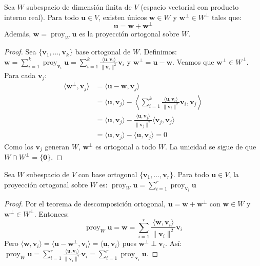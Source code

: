 \begin{theorem}
Sea $W$ subespacio de dimensión finita de $V$ (espacio vectorial con producto interno real). Para todo $\mathbf{u} \in V$, existen únicos $\mathbf{w} \in W$ y $\mathbf{w}^\perp \in W^\perp$ tales que:
\[
\mathbf{u} = \mathbf{w} + \mathbf{w}^\perp
\]
Además, $\mathbf{w} = \operatorname{proy}_W \mathbf{u}$ es la proyección ortogonal sobre $W$.
\end{theorem}

\begin{proof}
Sea $\{ \mathbf{v}_1, \dots, \mathbf{v}_k \}$ base ortogonal de $W$. Definimos: \(
\mathbf{w} = \sum_{i=1}^k \operatorname{proy}_{\mathbf{v}_i} \mathbf{u} = \sum_{i=1}^k \frac{\langle \mathbf{u}, \mathbf{v}_i \rangle}{\|\mathbf{v}_i\|^2} \mathbf{v}_i
\) 
y $\mathbf{w}^\perp = \mathbf{u} - \mathbf{w}$. Veamos que $\mathbf{w}^\perp \in W^\perp$. Para cada $\mathbf{v}_j$:
\begin{align*}
\langle \mathbf{w}^\perp, \mathbf{v}_j \rangle &= \langle \mathbf{u} - \mathbf{w}, \mathbf{v}_j \rangle \\
&= \langle \mathbf{u}, \mathbf{v}_j \rangle - \left\langle \sum_{i=1}^k \frac{\langle \mathbf{u}, \mathbf{v}_i \rangle}{\|\mathbf{v}_i\|^2} \mathbf{v}_i, \mathbf{v}_j \right\rangle \\
&= \langle \mathbf{u}, \mathbf{v}_j \rangle - \frac{\langle \mathbf{u}, \mathbf{v}_j \rangle}{\|\mathbf{v}_j\|^2} \langle \mathbf{v}_j, \mathbf{v}_j \rangle \\
&= \langle \mathbf{u}, \mathbf{v}_j \rangle - \langle \mathbf{u}, \mathbf{v}_j \rangle = 0
\end{align*}
Como los $\mathbf{v}_j$ generan $W$, $\mathbf{w}^\perp$ es ortogonal a todo $W$. La unicidad se sigue de que $W \cap W^\perp = \{\mathbf{0}\}$.
\end{proof}

\begin{theorem}\label{teodeo}
Sea $W$ subespacio de $V$ con base ortogonal $\{ \mathbf{v}_1, \dots, \mathbf{v}_r \}$. Para todo $\mathbf{u} \in V$, la proyección ortogonal sobre $W$ es: \(
\operatorname{proy}_W \mathbf{u} = \sum_{i=1}^r \operatorname{proy}_{\mathbf{v}_i} \mathbf{u}\)
\begin{proof}
Por el teorema de descomposición ortogonal, $\mathbf{u} = \mathbf{w} + \mathbf{w}^\perp$ con $\mathbf{w} \in W$ y $\mathbf{w}^\perp \in W^\perp$. Entonces:
\[
\operatorname{proy}_W \mathbf{u} = \mathbf{w} = \sum_{i=1}^r \frac{\langle \mathbf{w}, \mathbf{v}_i \rangle}{\|\mathbf{v}_i\|^2} \mathbf{v}_i
\]
Pero $\langle \mathbf{w}, \mathbf{v}_i \rangle = \langle \mathbf{u} - \mathbf{w}^\perp, \mathbf{v}_i \rangle = \langle \mathbf{u}, \mathbf{v}_i \rangle$ pues $\mathbf{w}^\perp \perp \mathbf{v}_i$. Así: \(
\operatorname{proy}_W \mathbf{u} = \sum_{i=1}^r \frac{\langle \mathbf{u}, \mathbf{v}_i \rangle}{\|\mathbf{v}_i\|^2} \mathbf{v}_i = \sum_{i=1}^r \operatorname{proy}_{\mathbf{v}_i} \mathbf{u}. \)
\end{proof}
\end{theorem}

